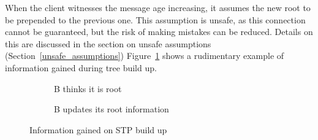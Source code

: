 When the client witnesses the message age increasing, it assumes the new root to be prepended to the previous one.
This assumption is unsafe, as this connection cannot be guaranteed, but the risk of making mistakes can be reduced.
Details on this are discussed in the section on unsafe assumptions (Section~\ref{unsafe_assumptions})
Figure~\ref{fig:build_up} shows a rudimentary example of information gained during tree build up.
\begin{figure}[p]
    \begin{centering}
        \begin{subfigure}[b]{0.4\textwidth}
            \centering
            \caption{B thinks it is root}
        \end{subfigure}
        \hspace{1cm}
        \begin{subfigure}[b]{0.4\textwidth}
            \centering
            \caption{B updates its root information}
        \end{subfigure}
    \end{centering}
    \caption{Information gained on STP build up}
    \label{fig:build_up}
\end{figure}

